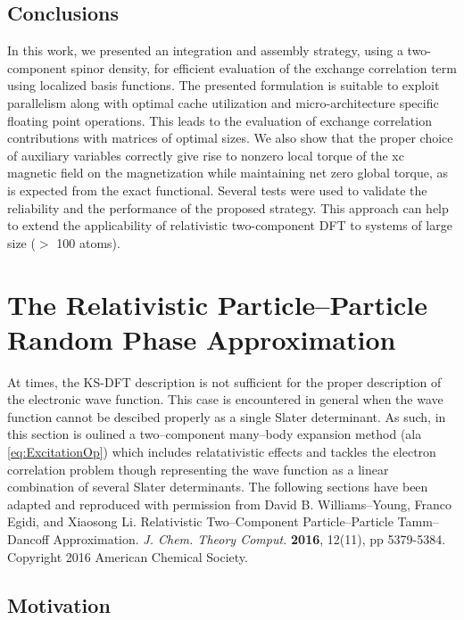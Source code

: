 \subsection{Conclusions}
In this work, we presented an integration and assembly strategy, 
using a two-component spinor density, for efficient evaluation
of the exchange correlation term using localized basis
functions. 
The presented formulation is suitable to exploit parallelism 
along with optimal cache utilization and micro-architecture specific floating point operations.
This leads to the evaluation of exchange correlation
contributions with matrices of optimal sizes. 
We also show that the proper choice of auxiliary variables 
correctly give rise to nonzero local torque of the xc magnetic field on the magnetization
while maintaining net zero global torque, as is expected from
the exact functional. 
Several tests were used to validate 
the reliability and the performance of the proposed strategy.
This approach can help to extend 
the applicability of relativistic two-component DFT 
to systems of large size ($>$ 100 atoms). 







\section{The Relativistic Particle--Particle Random Phase Approximation}

At times, the KS-DFT description is not sufficient for the proper description
of the electronic wave function. This case is encountered in general when
the wave function cannot be descibed properly as a single Slater determinant.
As such, in this section is oulined a two--component many--body expansion 
method (ala \cref{eq:ExcitationOp}) which includes relatativistic effects
and tackles the electron correlation problem though representing the wave function
as a linear combination of several Slater determinants. The following sections
have been adapted and reproduced with permission from David B. Williams--Young,
Franco Egidi, and Xiaosong Li. Relativistic Two--Component Particle--Particle
Tamm--Dancoff Approximation. \emph{J. Chem. Theory Comput.} \textbf{2016}, 12(11),
pp 5379-5384. Copyright 2016 American Chemical Society.




\subsection{Motivation}

